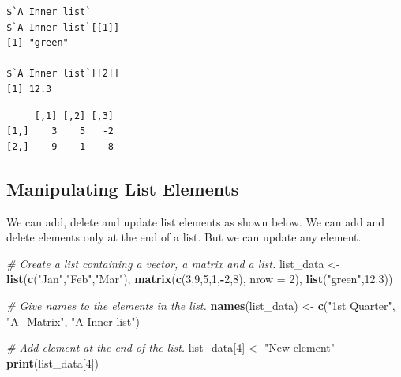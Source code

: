 \documentclass[]{book}
\newenvironment{Shaded}{\begin{snugshade}}{\end{snugshade}}
\newcommand{\CommentTok}[1]{\textcolor[rgb]{0.56,0.35,0.01}{\textit{#1}}}
\newcommand{\DataTypeTok}[1]{\textcolor[rgb]{0.13,0.29,0.53}{#1}}
\newcommand{\DecValTok}[1]{\textcolor[rgb]{0.00,0.00,0.81}{#1}}
\newcommand{\FloatTok}[1]{\textcolor[rgb]{0.00,0.00,0.81}{#1}}
\newcommand{\KeywordTok}[1]{\textcolor[rgb]{0.13,0.29,0.53}{\textbf{#1}}}
\newcommand{\NormalTok}[1]{#1}
\newcommand{\OperatorTok}[1]{\textcolor[rgb]{0.81,0.36,0.00}{\textbf{#1}}}
\newcommand{\StringTok}[1]{\textcolor[rgb]{0.31,0.60,0.02}{#1}}
\theoremstyle{definition}
\theoremstyle{definition}
\theoremstyle{definition}
\theoremstyle{remark}
\begin{document}
\begin{verbatim}
$`A Inner list`
$`A Inner list`[[1]]
[1] "green"

$`A Inner list`[[2]]
[1] 12.3
\end{verbatim}

\begin{Shaded}
\end{Shaded}

\begin{verbatim}
     [,1] [,2] [,3]
[1,]    3    5   -2
[2,]    9    1    8
\end{verbatim}

\hypertarget{manipulating-list-elements}{%
\subsection{Manipulating List
Elements}\label{manipulating-list-elements}}

We can add, delete and update list elements as shown below. We can add
and delete elements only at the end of a list. But we can update any
element.

\begin{Shaded}
\begin{Highlighting}[]
\CommentTok{# Create a list containing a vector, a matrix and a list.}
\NormalTok{list_data <-}\StringTok{ }\KeywordTok{list}\NormalTok{(}\KeywordTok{c}\NormalTok{(}\StringTok{"Jan"}\NormalTok{,}\StringTok{"Feb"}\NormalTok{,}\StringTok{"Mar"}\NormalTok{), }\KeywordTok{matrix}\NormalTok{(}\KeywordTok{c}\NormalTok{(}\DecValTok{3}\NormalTok{,}\DecValTok{9}\NormalTok{,}\DecValTok{5}\NormalTok{,}\DecValTok{1}\NormalTok{,}\OperatorTok{-}\DecValTok{2}\NormalTok{,}\DecValTok{8}\NormalTok{), }\DataTypeTok{nrow =} \DecValTok{2}\NormalTok{),}
   \KeywordTok{list}\NormalTok{(}\StringTok{"green"}\NormalTok{,}\FloatTok{12.3}\NormalTok{))}

\CommentTok{# Give names to the elements in the list.}
\KeywordTok{names}\NormalTok{(list_data) <-}\StringTok{ }\KeywordTok{c}\NormalTok{(}\StringTok{"1st Quarter"}\NormalTok{, }\StringTok{"A_Matrix"}\NormalTok{, }\StringTok{"A Inner list"}\NormalTok{)}

\CommentTok{# Add element at the end of the list.}
\NormalTok{list_data[}\DecValTok{4}\NormalTok{] <-}\StringTok{ "New element"}
\KeywordTok{print}\NormalTok{(list_data[}\DecValTok{4}\NormalTok{])}
\end{Highlighting}
\end{Shaded}
\end{document}
